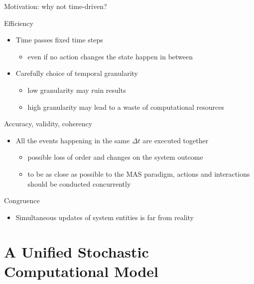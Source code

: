 \documentclass[presentation]{beamer} %
\begin{document}
\begin{frame}{Motivation: why not  time-driven?}

  \begin{block}{Efficiency}
    \begin{itemize}
      	\item Time passes fixed time steps
        \begin{itemize}
          	\item even if no action changes the state happen in between
	\end{itemize}
      	\item Carefully choice of temporal granularity
      	\begin{itemize}
      		\item low granularity may ruin results
		\item high granularity may lead to a waste of computational resources
	\end{itemize}
    \end{itemize}
 \end{block}
  
  \begin{block}{Accuracy, validity, coherency}
    \begin{itemize}
      \item All the events happening in the same $\Delta{}t$ are executed together
        \begin{itemize}
      		\item possible loss of order and changes on the system outcome
		\item to be as close as possible to the MAS paradigm, actions and interactions should be conducted concurrently
	 \end{itemize}
    \end{itemize}
  \end{block}
  
  \begin{block}{Congruence}
    \begin{itemize}
      \item  Simultaneous updates of system entities is far from reality
    \end{itemize}
  \end{block}

\end{frame}

\section{A Unified Stochastic Computational Model}
\end{document}
